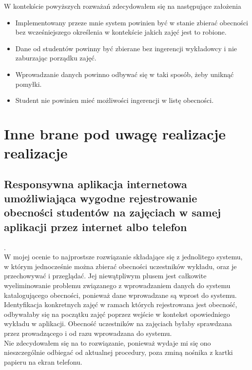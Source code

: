 \documentclass[declaration,shortabstract, mgr]{iithesis}
\begin{document}
\indent W kontekście powyższych rozważań zdecydowałem się na następujące założenia
\begin{itemize}
\item Implementowany przeze mnie system powinien być w stanie zbierać obecności bez wcześniejszego określenia w kontekście jakich zajęć jest to robione.
\item Dane od studentów powinny być zbierane bez ingerencji wykładowcy i nie zaburzając porządku zajęć.
\item Wprowadzanie danych powinno odbywać się w taki sposób, żeby uniknąć pomyłki.
\item Student nie powinien mieć możliwości ingerencji w listę obecności.
\end{itemize}

\section{Inne brane pod uwagę realizacje realizacje}
\subsection{Responsywna aplikacja internetowa umożliwiająca wygodne rejestrowanie obecności studentów na zajęciach w samej aplikacji przez internet albo telefon}. \\
W mojej ocenie to najprostsze rozwiązanie składające się z jednolitego systemu, w którym jednocześnie można zbierać obecności uczestników wykładu, oraz je przechowywać i przeglądać. Jej niewątpliwym plusem jest całkowite wyeliminowanie problemu związanego z wprowadzaniem danych do systemu katalogującego obecności, ponieważ dane wprowadzane są wprost do systemu. Identyfikacja konkretnych zajęć w ramach których rejestrowana jest obecność, odbywałaby się na początku zajęć poprzez wejście w kontekst opowiedniego wykładu w aplikacji. Obecność uczestników na zajęciach byłaby sprawdzana przez prowadzącego i od razu wprowadzana do systemu. \\
\indent Nie zdecydowałem się na to rozwiązanie, ponieważ wydaje mi się ono nieszczególnie odbiegać od aktualnej procedury, poza zminą nośnika z kartki papieru na ekran telefonu.
\end{document}
